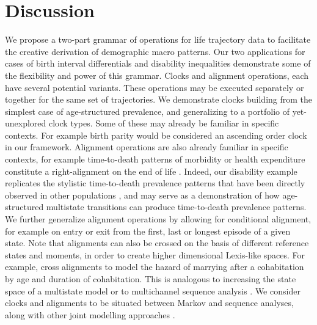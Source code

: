 \documentclass[a4paper,left=1.25cm,right=1.25cm,top=1.25cm,bottom=1.25cm]{article}
\begin{document}
\section{Discussion}

We propose a two-part grammar of operations for life trajectory data to facilitate the creative derivation of demographic macro patterns. Our two applications for cases of birth interval differentials and disability inequalities demonstrate some of the flexibility and power of this grammar. Clocks and alignment operations, each have several potential variants. These operations may be executed separately or together for the same set of trajectories. We demonstrate clocks building from the simplest case of age-structured prevalence, and generalizing to a portfolio of yet-unexplored clock types. Some of these may already be familiar in specific contexts. For example birth parity would be considered an ascending order clock in our framework. Alignment operations are also already familiar in specific contexts, for example time-to-death patterns of morbidity or health expenditure constitute a right-alignment on the end of life \citep{riffe2017unified, raab2018pathways, potente2018disability}. Indeed, our disability example replicates the stylistic time-to-death prevalence patterns that have been directly observed in other populations \citep{klijs2010disability, riffe2016time}, and may serve as a demonstration of how age-structured multistate transitions can produce time-to-death prevalence patterns. We further generalize alignment operations by allowing for conditional alignment, for example on entry or exit from the first, last or longest episode of a given state. Note that alignments can also be crossed on the basis of different reference states and moments, in order to create higher dimensional Lexis-like spaces. For example, \citet{carollo2020hazard} cross alignments to model the hazard of marrying after a cohabitation by age and duration of cohabitation. This is analogous to increasing the state space of a multistate model or to multichannel sequence analysis \citep{robette2015global, gauthier2010multichannel}. We consider clocks and alignments to be situated between Markov and sequence analyses, along with other joint modelling approaches \citep{studer2018estimating}.
\end{document}
